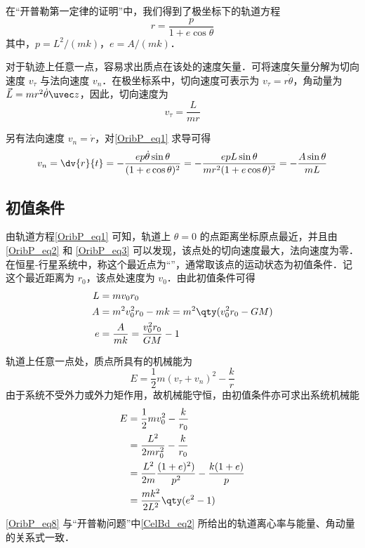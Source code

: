 

在“开普勒第一定律的证明”中，我们得到了极坐标下的轨道方程
\begin{equation}\label{OribP_eq1} 
r=\frac{p}{1+e \cos\theta}
\end{equation}
其中，$p=L^2/(mk)$，$e=A/(mk)$．

对于轨迹上任意一点，容易求出质点在该处的速度矢量．可将速度矢量分解为切向速度 $v_\tau$ 与法向速度 $v_n$．在极坐标系中，切向速度可表示为 $v_\tau =r \dot\theta$，角动量为 $\vec L  = mr^2\dot{\theta}\uvec z$，因此，切向速度为
\begin{equation}\label{OribP_eq2} 
v_\tau =\frac{L}{mr}
\end{equation}

另有法向速度 $v_n=\dot r$，对\autoref{OribP_eq1} 求导可得
\begin{equation} \label{OribP_eq3}
v_n =\dv{r}{t}=-\frac{ep\dot{\theta}\sin\theta}{(1+e\cos\theta)^2}=-\frac{epL\sin\theta}{mr^2(1+e\cos\theta)^2}=-\frac{A\sin\theta}{mL}
\end{equation}

\subsection{初值条件}
由轨道方程\autoref{OribP_eq1} 可知，轨道上 $\theta=0$ 的点距离坐标原点最近，并且由\autoref{OribP_eq2} 和 \autoref{OribP_eq3} 可以发现，该点处的切向速度最大，法向速度为零．在恒星-行星系统中，称这个最近点为“”，通常取该点的运动状态为初值条件．记这个最近距离为 $r_0$，该点处速度为 $v_0$．由此初值条件可得
\begin{align}
L &= mv_0r_0\\
A &= m^2v_0^2r_0-mk=m^2\qty(v_0^2r_0-GM)\\
e &= \frac{A}{mk}=\frac{v_0^2r_0}{GM}-1 
\end{align}

轨道上任意一点处，质点所具有的机械能为
\begin{equation} 
E =\frac{1}{2}m(v_{\tau}+v_n)^2-\frac{k}{r}
\end{equation}
由于系统不受外力或外力矩作用，故机械能守恒，由初值条件亦可求出系统机械能
\begin{equation} \label{OribP_eq8}
\begin{aligned}
E &=\frac{1}{2}mv_0^2-\frac{k}{r_0}\\
   &=\frac{L^2}{2mr_0^2}-\frac{k}{r_0}\\
   &=\frac{L^2}{2m}\frac{(1+e)^2)}{p^2}-\frac{k(1+e)}{p}\\
   &=\frac{mk^2}{2L^2}\qty(e^2-1)
\end{aligned}
\end{equation}
\autoref{OribP_eq8} 与“开普勒问题”中\autoref{CelBd_eq2} 所给出的轨道离心率与能量、角动量的关系式一致．


